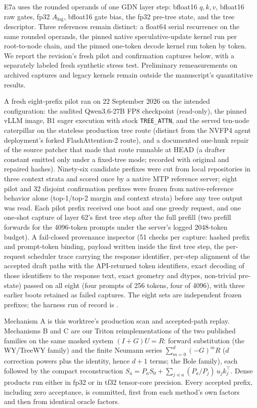 \documentclass[conference]{IEEEtran}
\begin{document}
E7a uses the rounded operands of one GDN layer step: bfloat16 $q,k,v$, bfloat16 raw gates, fp32 $A_{\log}$, bfloat16 gate bias, the fp32 pre-tree state, and the tree descriptor. Three references remain distinct: a float64 serial recurrence on the same rounded operands, the pinned native speculative-update kernel run per root-to-node chain, and the pinned one-token decode kernel run token by token. We report the revision's fresh pilot and confirmation captures below, with a separately labeled fresh synthetic stress test. Preliminary remeasurements on archived captures and legacy kernels remain outside the manuscript's quantitative results.

A fresh eight-prefix pilot ran on 22 September 2026 on the intended configuration: the audited Qwen3.6-27B FP8 checkpoint (read-only), the pinned vLLM image, B1 eager execution with stock \texttt{TREE\_ATTN}, and the served ten-node caterpillar on the stateless production tree route (distinct from the NVFP4 agent deployment's forked FlashAttention-2 route), and a documented one-hunk repair of the source patcher that made that route runnable at HEAD (a drafter constant emitted only under a fixed-tree mode; recorded with original and repaired hashes). Ninety-six candidate prefixes were cut from local repositories in three context strata and scored once by a native MTP reference server; eight pilot and 32 disjoint confirmation prefixes were frozen from native-reference behavior alone (top-1/top-2 margin and context strata) before any tree output was read. Each pilot prefix received one boot and one greedy request, and one one-shot capture of layer 62's first tree step after the full prefill (two prefill forwards for the 4096-token prompts under the server's logged 2048-token budget). A fail-closed provenance inspector (51 checks per capture: hashed prefix and prompt-token binding, payload written inside the first tree step, the per-request scheduler trace carrying the response identifier, per-step alignment of the accepted draft paths with the API-returned token identifiers, exact decoding of those identifiers to the response text, exact geometry and dtypes, non-trivial pre-state) passed on all eight (four prompts of 256 tokens, four of 4096), with three earlier boots retained as failed captures. The eight sets are independent frozen prefixes; the harness run of record is .

Mechanism A is this worktree's production scan and accepted-path replay. Mechanisms B and C are our Triton reimplementations of the two published families on the same masked system $(I+G)U=R$: forward substitution (the WY/TreeWY family) and the finite Neumann series $\sum_{m=0}^{d}(-G)^mR$ ($d$ correction powers plus the identity, hence $d+1$ terms; the Bole family), each followed by the compact reconstruction $S_a=P_aS_0+\sum_{j\preceq a}(P_a/P_j)\,u_jk_j^\top$. Dense products run either in fp32 or in tf32 tensor-core precision. Every accepted prefix, including zero acceptance, is committed, first from each method's own factors and then from identical oracle factors.
\end{document}
